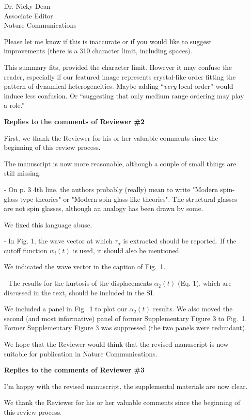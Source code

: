 \documentclass[a4paper, rebuttal, parskip=true, firsthead=false, fromemail=true, foldmarks=false]{scrlttr2}
\begin{document}
\begin{letter}{Dr. Nicky Dean\\
Associate Editor\\
Nature Communications}
\begin{quotationi}
Please let me know if this is inaccurate or if you would like to suggest improvements (there is a 310 character limit, including spaces).
\end{quotationi}
This summary fits, provided the character limit. However it may confuse the reader, especially if our featured image represents crystal-like order fitting the pattern of dynamical heterogeneities. Maybe adding ``\textit{very} local order'' would induce less confusion. Or ``suggesting that only medium range ordering may play a role.''

\clearpage
\textbf{Replies to the comments of Reviewer \#2}

First, we thank the Reviewer for his or her valuable comments since the beginning of this review process.

\begin{quotationi}
The manuscript is now more reasonable, although a couple of small things are still missing.

- On p. 3 4th line, the authors probably (really) mean to write "Modern spin-glass-type theories" or "Modern spin-glass-like theories". The structural glasses are not spin glasses, although an analogy has been drawn by some.
\end{quotationi}
We fixed this language abuse.

\begin{quotationi}
- In Fig. 1, the wave vector at which $\tau_\alpha$ is extracted should be reported. If the cutoff function $w_i(t)$ is used, it should also be mentioned.
\end{quotationi}
We indicated the wave vector in the caption of Fig.~1.

\begin{quotationi}
- The results for the kurtosis of the displacements $\alpha_2(t)$ (Eq. 1), which are discussed in the text, should be included in the SI.
\end{quotationi}

We included a panel in Fig.~1 to plot our $\alpha_2(t)$ results. We also moved the second (and most informative) panel of former Supplementary Figure 3 to Fig.~1. Former Supplementary Figure 3 was suppressed (the two panels were redundant).

We hope that the Reviewer would think that the revised manuscript is now suitable for publication in Nature Communications. 

\clearpage
\textbf{Replies to the comments of Reviewer \#3}
\begin{quotationi}
I'm happy with the revised manuscript, the supplemental materials are now clear.
\end{quotationi}

We thank the Reviewer for his or her valuable comments since the beginning of this review process.

\end{letter} 
\end{document}
